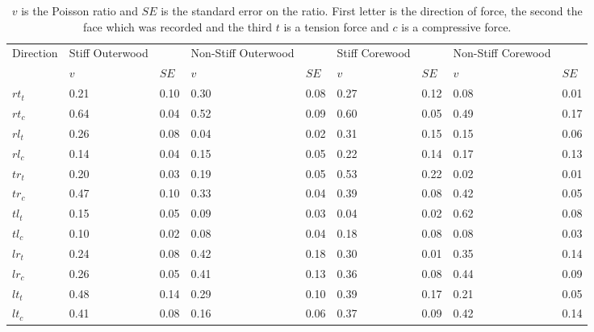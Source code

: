\documentclass[10pt]{article}
\begin{document}
\begin{table}
\caption[Poisson ratios]{\(v\) is the Poisson ratio and \(SE\) is the standard error on the ratio. First letter is the direction of force, the second the face which was recorded and the third \(t\) is a tension force and \(c\) is a compressive force.}
\label{table:poisson ratios}
\begin{tabular}{lllllllll}
\hline
Direction& Stiff Outerwood&& Non-Stiff Outerwood&& Stiff Corewood&&Non-Stiff Corewood&\\
 & \(v\)&\(SE\)& \(v\)&\(SE\)& \(v\)&\(SE\)& \(v\)&\(SE\)\\
\hline
\(rt_t\) & 0.21 & 0.10 & 0.30 & 0.08& 0.27 & 0.12& 0.08 & 0.01\\
\(rt_c\) & 0.64 & 0.04 & 0.52 & 0.09& 0.60 & 0.05& 0.49 & 0.17\\
\(rl_t\) & 0.26 & 0.08& 0.04 & 0.02& 0.31 & 0.15& 0.15 & 0.06 \\
\(rl_c\) & 0.14 & 0.04& 0.15 & 0.05& 0.22 & 0.14& 0.17 & 0.13 \\
\(tr_t\) & 0.20 & 0.03 & 0.19 & 0.05& 0.53 & 0.22& 0.02 & 0.01\\
\(tr_c\) & 0.47 & 0.10 & 0.33 & 0.04& 0.39 & 0.08& 0.42 & 0.05\\
\(tl_t\) & 0.15 & 0.05 & 0.09 & 0.03& 0.04 & 0.02& 0.62 & 0.08\\
\(tl_c\) & 0.10 & 0.02 & 0.08 & 0.04& 0.18 & 0.08& 0.08 & 0.03\\
\(lr_t\) & 0.24 & 0.08& 0.42& 0.18& 0.30 & 0.01& 0.35 & 0.14 \\
\(lr_c\) & 0.26 & 0.05& 0.41 & 0.13& 0.36 & 0.08& 0.44 & 0.09 \\
\(lt_t\) & 0.48 & 0.14& 0.29 & 0.10& 0.39 & 0.17& 0.21 & 0.05 \\
\(lt_c\) & 0.41 & 0.08& 0.16 & 0.06& 0.37 & 0.09& 0.42 & 0.14 \\
\hline
\end{tabular}
\end{table}
\end{document}
